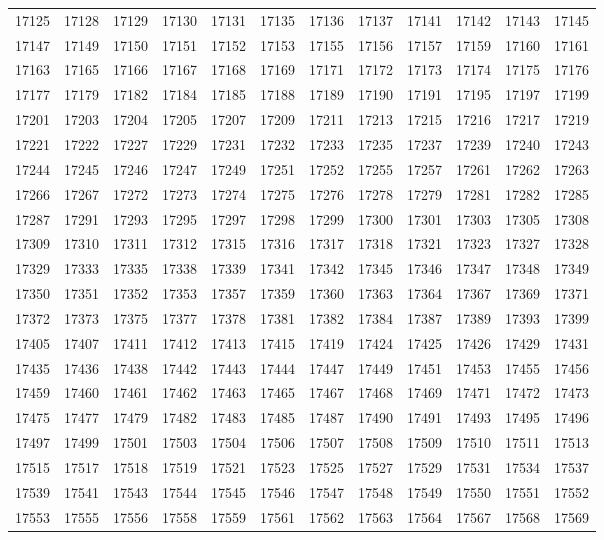\begin{center}
\begin{longtable}{llllllllllll}
17125 &17128 &17129 &17130 &17131 &17135 &17136 &17137 &17141 &17142 &17143 &17145 \\
17147 &17149 &17150 &17151 &17152 &17153 &17155 &17156 &17157 &17159 &17160 &17161 \\
17163 &17165 &17166 &17167 &17168 &17169 &17171 &17172 &17173 &17174 &17175 &17176 \\
17177 &17179 &17182 &17184 &17185 &17188 &17189 &17190 &17191 &17195 &17197 &17199 \\
17201 &17203 &17204 &17205 &17207 &17209 &17211 &17213 &17215 &17216 &17217 &17219 \\
17221 &17222 &17227 &17229 &17231 &17232 &17233 &17235 &17237 &17239 &17240 &17243 \\
17244 &17245 &17246 &17247 &17249 &17251 &17252 &17255 &17257 &17261 &17262 &17263 \\
17266 &17267 &17272 &17273 &17274 &17275 &17276 &17278 &17279 &17281 &17282 &17285 \\
17287 &17291 &17293 &17295 &17297 &17298 &17299 &17300 &17301 &17303 &17305 &17308 \\
17309 &17310 &17311 &17312 &17315 &17316 &17317 &17318 &17321 &17323 &17327 &17328 \\
17329 &17333 &17335 &17338 &17339 &17341 &17342 &17345 &17346 &17347 &17348 &17349 \\
17350 &17351 &17352 &17353 &17357 &17359 &17360 &17363 &17364 &17367 &17369 &17371 \\
17372 &17373 &17375 &17377 &17378 &17381 &17382 &17384 &17387 &17389 &17393 &17399 \\
17405 &17407 &17411 &17412 &17413 &17415 &17419 &17424 &17425 &17426 &17429 &17431 \\
17435 &17436 &17438 &17442 &17443 &17444 &17447 &17449 &17451 &17453 &17455 &17456 \\
17459 &17460 &17461 &17462 &17463 &17465 &17467 &17468 &17469 &17471 &17472 &17473 \\
17475 &17477 &17479 &17482 &17483 &17485 &17487 &17490 &17491 &17493 &17495 &17496 \\
17497 &17499 &17501 &17503 &17504 &17506 &17507 &17508 &17509 &17510 &17511 &17513 \\
17515 &17517 &17518 &17519 &17521 &17523 &17525 &17527 &17529 &17531 &17534 &17537 \\
17539 &17541 &17543 &17544 &17545 &17546 &17547 &17548 &17549 &17550 &17551 &17552 \\
17553 &17555 &17556 &17558 &17559 &17561 &17562 &17563 &17564 &17567 &17568 &17569 \\

\end{longtable}
\end{center}
